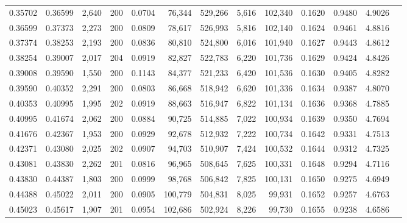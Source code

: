 \begin{tabular}{rrrrrrrrrrrrr}
0.35702 & 0.36599 & 2,640 & 200 &                                     0.0704 &  76,344 & 529,266 &   5,616 & 102,340 & 0.1620 & 0.9480 & 4.9026 \\
0.36599 & 0.37373 & 2,273 & 200 &                                     0.0809 &  78,617 & 526,993 &   5,816 & 102,140 & 0.1624 & 0.9461 & 4.8816 \\
0.37374 & 0.38253 & 2,193 & 200 &                                     0.0836 &  80,810 & 524,800 &   6,016 & 101,940 & 0.1627 & 0.9443 & 4.8612 \\
0.38254 & 0.39007 & 2,017 & 204 &                                     0.0919 &  82,827 & 522,783 &   6,220 & 101,736 & 0.1629 & 0.9424 & 4.8426 \\
0.39008 & 0.39590 & 1,550 & 200 &                                     0.1143 &  84,377 & 521,233 &   6,420 & 101,536 & 0.1630 & 0.9405 & 4.8282 \\
0.39590 & 0.40352 & 2,291 & 200 &                                     0.0803 &  86,668 & 518,942 &   6,620 & 101,336 & 0.1634 & 0.9387 & 4.8070 \\
0.40353 & 0.40995 & 1,995 & 202 &                                     0.0919 &  88,663 & 516,947 &   6,822 & 101,134 & 0.1636 & 0.9368 & 4.7885 \\
0.40995 & 0.41674 & 2,062 & 200 &                                     0.0884 &  90,725 & 514,885 &   7,022 & 100,934 & 0.1639 & 0.9350 & 4.7694 \\
0.41676 & 0.42367 & 1,953 & 200 &                                     0.0929 &  92,678 & 512,932 &   7,222 & 100,734 & 0.1642 & 0.9331 & 4.7513 \\
0.42371 & 0.43080 & 2,025 & 202 &                                     0.0907 &  94,703 & 510,907 &   7,424 & 100,532 & 0.1644 & 0.9312 & 4.7325 \\
0.43081 & 0.43830 & 2,262 & 201 &                                     0.0816 &  96,965 & 508,645 &   7,625 & 100,331 & 0.1648 & 0.9294 & 4.7116 \\
0.43830 & 0.44387 & 1,803 & 200 &                                     0.0999 &  98,768 & 506,842 &   7,825 & 100,131 & 0.1650 & 0.9275 & 4.6949 \\
0.44388 & 0.45022 & 2,011 & 200 &                                     0.0905 & 100,779 & 504,831 &   8,025 &  99,931 & 0.1652 & 0.9257 & 4.6763 \\
0.45023 & 0.45617 & 1,907 & 201 &                                     0.0954 & 102,686 & 502,924 &   8,226 &  99,730 & 0.1655 & 0.9238 & 4.6586 \\

\end{tabular}
